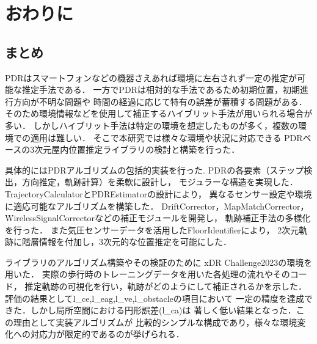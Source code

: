 \chapter{おわりに}
\thispagestyle{myheadings}


\section{まとめ}

PDRはスマートフォンなどの機器さえあれば環境に左右されず一定の推定が可能な推定手法である．
一方でPDRは相対的な手法であるため初期位置，初期進行方向が不明な問題や
時間の経過に応じて特有の誤差が蓄積する問題がある．
そのため環境情報などを使用して補正するハイブリット手法が用いられる場合が多い．
しかしハイブリット手法は特定の環境を想定したものが多く，複数の環境での適用は難しい．
そこで本研究では様々な環境や状況に対応できる
PDRベースの3次元屋内位置推定ライブラリの検討と構築を行った．

具体的にはPDRアルゴリズムの包括的実装を行った.
PDRの各要素（ステップ検出，方向推定，軌跡計算）を柔軟に設計し，
モジュラーな構造を実現した．TrajectoryCalculatorとPDREstimatorの設計により，
異なるセンサー設定や環境に適応可能なアルゴリズムを構築した．
DriftCorrector，MapMatchCorrector，WirelessSignalCorrectorなどの補正モジュールを開発し，
軌跡補正手法の多様化を行った．
また気圧センサーデータを活用したFloorIdentifierにより，
2次元軌跡に階層情報を付加し，3次元的な位置推定を可能にした．

ライブラリのアルゴリズム構築やその検証のために
xDR Challenge2023の環境を用いた．
実際の歩行時のトレーニングデータを用いた各処理の流れやそのコード，
推定軌跡の可視化を行い，軌跡がどのようにして補正されるかを示した．
評価の結果としてl\_ce,l\_eag,l\_ve,l\_obstacleの項目において
一定の精度を達成できた．しかし局所空間における円形誤差(l\_ca)は
著しく低い結果となった．この理由として実装アルゴリズムが
比較的シンプルな構成であり，様々な環境変化への対応力が限定的であるのが挙げられる．



